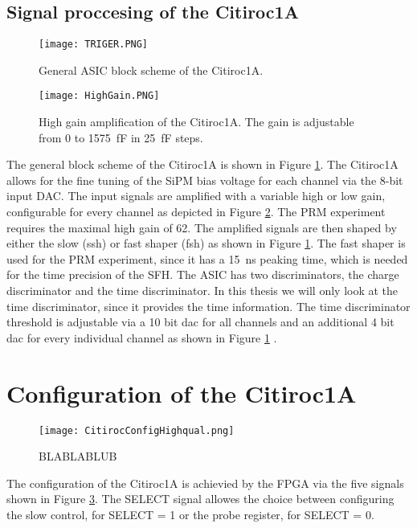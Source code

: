 \subsection{Signal proccesing of the Citiroc1A}
\begin{figure}[h]
    \centering
    \texttt{[image: TRIGER.PNG]}
    \caption{General ASIC block scheme of the Citiroc1A. \autocite{datasheetCITIROC}}
    \label{fig:CITIROC1A_TRIGEER}
\end{figure}

\begin{figure}[h]
    \centering
    \texttt{[image: HighGain.PNG]}
    \caption{High gain amplification of the Citiroc1A. The gain is adjustable from 0 to \SI{1575}{\femto\farad} in \SI{25}{\femto\farad} steps.\autocite{datasheetCITIROC}}
    \label{HighGain}
\end{figure}
The general block scheme of the Citiroc1A is shown in Figure \ref{fig:CITIROC1A_TRIGEER}.
\newline
The Citiroc1A allows for the fine tuning of the SiPM bias voltage for each channel via the 8-bit input DAC.
\newline	
The input signals are amplified with a variable high or low gain, configurable for every channel as depicted in Figure \ref{HighGain}. 
The PRM experiment requires the maximal high gain of 62.\autocite{InternalcommunicationIgor}
\newline
The amplified signals are then shaped by either the slow (ssh) or fast shaper (fsh) as shown in Figure \ref{fig:CITIROC1A_TRIGEER}. 
The fast shaper is used for the PRM experiment, since it has a \SI{15}{\nano\second} peaking time, which is needed for the time precision of the SFH.
\newline
The ASIC has two discriminators, the charge discriminator and the time discriminator. In this thesis we will only look at the time discriminator,
 since it provides the time information.
The time discriminator threshold is adjustable via a 10 bit dac for all channels and an additional 4 bit dac for every individual channel as shown in Figure \ref{fig:CITIROC1A_TRIGEER} \autocite{datasheetCITIROC}.


\section{Configuration of the Citiroc1A}
\begin{figure}[h]
    \centering
    \texttt{[image: CitirocConfigHighqual.png]}
    \caption{BLABLABLUB\autocite{datasheetCITIROC}}
    \label{fig:CITIROC1A_config}
\end{figure}
The configuration of the Citiroc1A is achievied by the FPGA via the five signals shown in Figure \ref{fig:CITIROC1A_config}.
The SELECT signal allowes the choice between configuring the slow control, for SELECT = 1  or the probe register, for SELECT = 0.\autocite{datasheetCITIROC}

